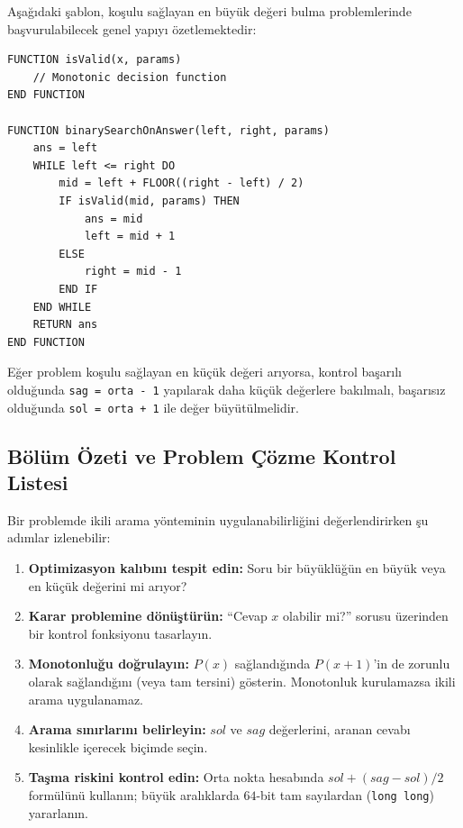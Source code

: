 Aşağıdaki şablon, koşulu sağlayan en büyük değeri bulma problemlerinde başvurulabilecek genel yapıyı özetlemektedir:

\begin{lstlisting}
FUNCTION isValid(x, params)
    // Monotonic decision function
END FUNCTION

FUNCTION binarySearchOnAnswer(left, right, params)
    ans = left
    WHILE left <= right DO
        mid = left + FLOOR((right - left) / 2)
        IF isValid(mid, params) THEN
            ans = mid
            left = mid + 1
        ELSE
            right = mid - 1
        END IF
    END WHILE
    RETURN ans
END FUNCTION\end{lstlisting}

Eğer problem koşulu sağlayan en küçük değeri arıyorsa, kontrol başarılı olduğunda \texttt{sag = orta - 1} yapılarak daha küçük değerlere bakılmalı, başarısız olduğunda \texttt{sol = orta + 1} ile değer büyütülmelidir.

\subsection{Bölüm Özeti ve Problem Çözme Kontrol Listesi}

Bir problemde ikili arama yönteminin uygulanabilirliğini değerlendirirken şu adımlar izlenebilir:

\begin{enumerate}
    \item \textbf{Optimizasyon kalıbını tespit edin:} Soru bir büyüklüğün en büyük veya en küçük değerini mi arıyor?
    \item \textbf{Karar problemine dönüştürün:} ``Cevap $x$ olabilir mi?'' sorusu üzerinden bir kontrol fonksiyonu tasarlayın.
    \item \textbf{Monotonluğu doğrulayın:} $P(x)$ sağlandığında $P(x+1)$'in de zorunlu olarak sağlandığını (veya tam tersini) gösterin. Monotonluk kurulamazsa ikili arama uygulanamaz.
    \item \textbf{Arama sınırlarını belirleyin:} $sol$ ve $sag$ değerlerini, aranan cevabı kesinlikle içerecek biçimde seçin.
    \item \textbf{Taşma riskini kontrol edin:} Orta nokta hesabında $sol + (sag - sol) / 2$ formülünü kullanın; büyük aralıklarda $64$-bit tam sayılardan (\texttt{long long}) yararlanın.
\end{enumerate}
